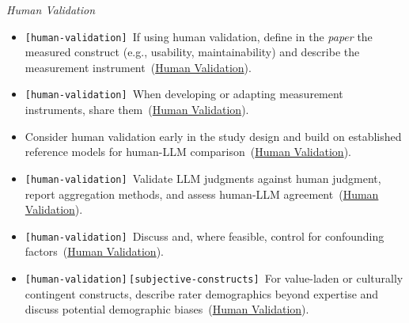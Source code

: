\documentclass[smallextended]{svjour3}
\makeatletter
\newcommand{\must}{\textbf{must}\xspace}
\newcommand{\should}{\textbf{should}\xspace}
\newcommand{\paper}{\emph{paper}\xspace}
\newcommand{\paper}{\emph{paper}\xspace}
\newcommand{\iconM}{\usebox{\iconMbox}\xspace}
\newcommand{\iconS}{\usebox{\iconSbox}\xspace}
\newcommand{\iconM}{●\xspace}
\newcommand{\iconS}{○\xspace}
\newcommand{\condition}[1]{\texttt{\small[#1]}\,}
\newcommand{\condition}[1]{@@cond:#1@@}
\newcommand{\refhumanvalidation}{\hyperref[sec:use-human-validation-for-llm-outputs]{Human Validation}}
\newcommand{\refhumanvalidation}{\href{/guidelines/use-human-validation-for-llm-outputs/}{Human Validation}}
\makeatother
\begin{document}
\begin{appendices}
\noindent\textit{Human Validation}
\begin{itemize}[label={},leftmargin=*]
    \item \iconM \condition{human-validation} If using human validation, define in the \paper the measured construct (e.g., usability, maintainability) and describe the measurement instrument~(\refhumanvalidation).
    \item \iconM \condition{human-validation} When developing or adapting measurement instruments, share them~(\refhumanvalidation).
    \item \iconS Consider human validation early in the study design and build on established reference models for human-LLM comparison~(\refhumanvalidation).
    \item \iconS \condition{human-validation} Validate LLM judgments against human judgment, report aggregation methods, and assess human-LLM agreement~(\refhumanvalidation).
    \item \iconS \condition{human-validation} Discuss and, where feasible, control for confounding factors~(\refhumanvalidation).
    \item \iconS \condition{human-validation}\condition{subjective-constructs} For value-laden or culturally contingent constructs, describe rater demographics beyond expertise and discuss potential demographic biases~(\refhumanvalidation).
\end{itemize}


\end{appendices}
\end{document}
